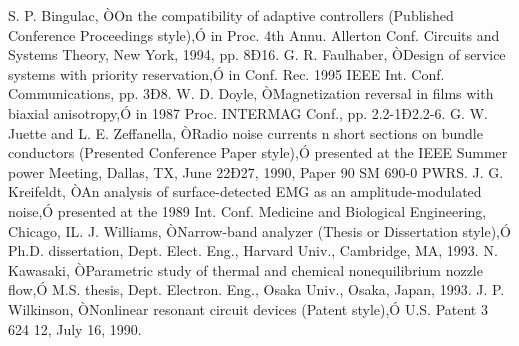 \documentclass[letterpaper, 10 pt, conference]{ieeeconf}  %
\begin{document}
\begin{thebibliography}{99}
 S. P. Bingulac, ÒOn the compatibility of adaptive controllers (Published Conference Proceedings style),Ó in Proc. 4th Annu. Allerton Conf. Circuits and Systems Theory, New York, 1994, pp. 8Ð16.
 G. R. Faulhaber, ÒDesign of service systems with priority reservation,Ó in Conf. Rec. 1995 IEEE Int. Conf. Communications, pp. 3Ð8.
 W. D. Doyle, ÒMagnetization reversal in films with biaxial anisotropy,Ó in 1987 Proc. INTERMAG Conf., pp. 2.2-1Ð2.2-6.
 G. W. Juette and L. E. Zeffanella, ÒRadio noise currents n short sections on bundle conductors (Presented Conference Paper style),Ó presented at the IEEE Summer power Meeting, Dallas, TX, June 22Ð27, 1990, Paper 90 SM 690-0 PWRS.
 J. G. Kreifeldt, ÒAn analysis of surface-detected EMG as an amplitude-modulated noise,Ó presented at the 1989 Int. Conf. Medicine and Biological Engineering, Chicago, IL.
 J. Williams, ÒNarrow-band analyzer (Thesis or Dissertation style),Ó Ph.D. dissertation, Dept. Elect. Eng., Harvard Univ., Cambridge, MA, 1993. 
 N. Kawasaki, ÒParametric study of thermal and chemical nonequilibrium nozzle flow,Ó M.S. thesis, Dept. Electron. Eng., Osaka Univ., Osaka, Japan, 1993.
 J. P. Wilkinson, ÒNonlinear resonant circuit devices (Patent style),Ó U.S. Patent 3 624 12, July 16, 1990. 






\end{thebibliography}
\end{document}
